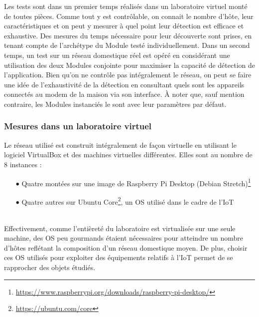 \documentclass[]{article}
\newcommand{\minit}[1]{\noindent{\small\textbf{ \underline{#1}}}\vspace{0.2cm}}
\begin{document}
Les tests sont dans un premier temps réalisés dans un laboratoire virtuel monté de toutes pièces. Comme tout y est contrôlable, on connait le nombre d'hôte, leur caractéristiques et on peut y mesurer à quel point leur détection est efficace et exhaustive. Des mesures du temps nécessaire pour leur découverte sont prises, en tenant compte de l'archétype du Module testé individuellement. Dans un second temps, un test sur un réseau domestique réel est opéré en considérant une utilisation des deux Modules conjointe pour maximiser la capacité de détection de l'application. Bien qu'on ne contrôle pas intégralement le réseau, on peut se faire une idée de l'exhaustivité de la détection en consultant quels sont les appareils connectés au modem de la maison via son interface. À noter que, sauf mention contraire, les Modules instanciés le sont avec leur paramètres par défaut.  

\newpage

\subsubsection{Mesures dans un laboratoire virtuel}

Le réseau utilisé est construit intégralement de façon virtuelle en utilisant le logiciel VirtualBox et des machines virtuelles différentes. Elles sont au nombre de 8 instances :~\\
\begin{itemize}
\item[$\bullet$] Quatre montées sur une image de Raspberry Pi Desktop (Debian Stretch)\footnote{\url{https://www.raspberrypi.org/downloads/raspberry-pi-desktop/}}
\item[$\bullet$] Quatre autres sur Ubuntu Core\footnote{\url{https://ubuntu.com/core}}, un OS utilisé dans le cadre de l'IoT
\end{itemize}
~\\
Effectivement, comme l'entièreté du laboratoire est virtualisée sur une seule machine, des OS peu gourmands étaient nécessaires pour atteindre un nombre d'hôtes reflétant la composition d'un réseau domestique moyen. De plus, choisir ces OS utilisés pour exploiter des équipements relatifs à l'IoT permet de se rapprocher des objets étudiés.\\

\minit{Mesures pour \texttt{fping}}
\vspace{0.1cm}
\end{document}
